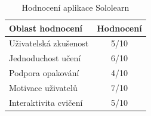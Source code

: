 \begin{table}[ht]
    \centering
    \begin{tabular}{@{} l c @{}}
        \toprule
        Oblast hodnocení & Hodnocení \\
        \midrule
        Uživatelská zkušenost & 5/10 \\
        Jednoduchost učení & 6/10 \\
        Podpora opakování & 4/10 \\
        Motivace uživatelů & 7/10 \\
        Interaktivita cvičení & 5/10 \\
        \bottomrule
    \end{tabular}
    \captionsetup{justification=centering}
    \caption{Hodnocení aplikace Sololearn}
    \label{table:competitor-rating-sololearn}
\end{table}
